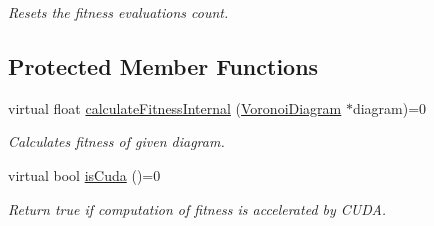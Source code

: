 \begin{DoxyCompactItemize}
\begin{DoxyCompactList}\small\item\em Resets the fitness evaluations count. \end{DoxyCompactList}\end{DoxyCompactItemize}
\subsection*{Protected Member Functions}
\begin{DoxyCompactItemize}
\item 
virtual float \hyperlink{classlossycompressor_1_1_fitness_evaluator_aa58aa833525109f332c302eb38ee5ec8}{calculate\+Fitness\+Internal} (\hyperlink{structlossycompressor_1_1_voronoi_diagram}{Voronoi\+Diagram} $\ast$diagram)=0
\begin{DoxyCompactList}\small\item\em Calculates fitness of given diagram. \end{DoxyCompactList}\item 
virtual bool \hyperlink{classlossycompressor_1_1_fitness_evaluator_a8112713ec4397ed2d83d3fd6f5b15895}{is\+Cuda} ()=0\hypertarget{classlossycompressor_1_1_fitness_evaluator_a8112713ec4397ed2d83d3fd6f5b15895}{}\label{classlossycompressor_1_1_fitness_evaluator_a8112713ec4397ed2d83d3fd6f5b15895}

\begin{DoxyCompactList}\small\item\em Return true if computation of fitness is accelerated by C\+U\+DA. \end{DoxyCompactList}\end{DoxyCompactItemize}
